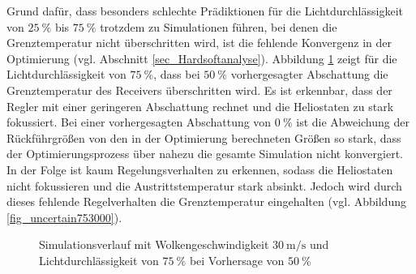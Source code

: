 Grund dafür, dass besonders schlechte Prädiktionen für die Lichtdurchlässigkeit von $\SI{25}{\percent}$ bis $\SI{75}{\percent}$ trotzdem zu Simulationen führen, bei denen die Grenztemperatur nicht überschritten wird, ist die fehlende Konvergenz in der Optimierung (vgl. Abschnitt \ref{sec_Hardsoftanalyse}).\linebreak
Abbildung \ref{fig_uncertain753050} zeigt für die Lichtdurchlässigkeit von $\SI{75}{\percent}$, dass bei $\SI{50}{\percent}$ vorhergesagter Abschattung die Grenztemperatur des Receivers überschritten wird.
Es ist erkennbar, dass der Regler mit einer geringeren Abschattung rechnet und die Heliostaten zu stark fokussiert.
Bei einer vorhergesagten Abschattung von $\SI{0}{\percent}$ ist die Abweichung der Rückführgrößen von den in der Optimierung berechneten Größen so stark, dass der Optimierungsprozess über nahezu die gesamte Simulation nicht konvergiert.
In der Folge ist kaum Regelungsverhalten zu erkennen, sodass die Heliostaten nicht fokussieren und die Austrittstemperatur stark absinkt.
Jedoch wird durch dieses fehlende Regelverhalten die Grenztemperatur eingehalten (vgl. Abbildung \ref{fig_uncertain753000}).

\begin{figure}[h!]
    \centering
    \setlength{\fboxsep}{1pt}
    \setlength{\fboxrule}{1pt}
    \caption[Simulationsverlauf mit Wolkengeschwindigkeit $\SI{30}{\metre\per\second}$ und Lichtdurchlässigkeit von $\SI{75}{\percent}$ bei Vorhersage von $\SI{50}{\percent}$]{Simulationsverlauf mit Wolkengeschwindigkeit $\SI{30}{\metre\per\second}$ und Lichtdurchlässigkeit von $\SI{75}{\percent}$ bei Vorhersage von $\SI{50}{\percent}$}
    \label{fig_uncertain753050}
\end{figure}

